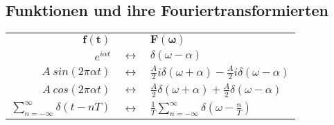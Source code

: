 \subsection{Funktionen und ihre Fouriertransformierten}%
\label{four:sub:funktionen_und_ihre_fouriertransformierten}

\begin{center}
	\begin{tabular}{r c l}
		$\mathbf{f(t)}$ 							& 					& $\mathbf{F(\omega)}$\\
		$e^{i\alpha t}$ 							& $\leftrightarrow$ & $\delta(\omega - \alpha)$\\
		$A\ sin(2\pi\alpha t)$ 						& $\leftrightarrow$ & $\frac{A}{2}i\delta(\omega + \alpha) - \frac{A}{2}i\delta(\omega - \alpha)$\\
		$A\ cos(2\pi\alpha t)$ 						& $\leftrightarrow$ & $\frac{A}{2}\delta(\omega + \alpha) + \frac{A}{2}\delta(\omega - \alpha)$\\
		$\sum^\infty_{n=-\infty}\delta(t - nT)$ 	& $\leftrightarrow$ & $\frac{1}{T}\sum^\infty_{n=-\infty}\delta(\omega - \frac{n}{T})$
	\end{tabular}
\end{center}